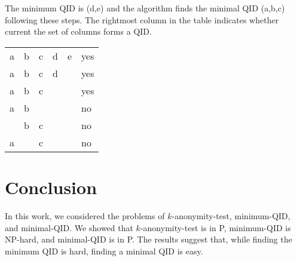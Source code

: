 \documentclass[12pt]{llncs}
\begin{document}
The minimum QID is (d,e) and the algorithm finds the minimal QID (a,b,c) following these steps. The rightmost column in the table indicates whether current the set of columns forms a QID.
\begin{center}
    \begin{tabular}{ | M{3em} | M{3em} | M{3em} | M{3em} | M{3em} | M{3em} | }
    \hline
    a & b & c & d & e & yes\\
    a & b & c & d &   & yes\\
    a & b & c &   &   & yes\\
    a & b &   &   &   & no\\
      & b & c &   &   & no\\
    a &   & c &   &   & no\\
    \hline
    \end{tabular}
\end{center}

\section{Conclusion}
In this work, we considered the problems of $k$-anonymity-test, minimum-QID, and minimal-QID. We showed that $k$-anonymity-test is in P, minimum-QID is NP-hard, and minimal-QID is in P. The results suggest that, while finding the minimum QID is hard, finding a minimal QID is easy.



\end{document}
